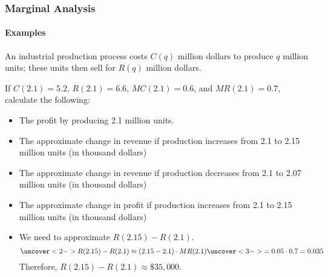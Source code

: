 \documentclass[9pt,xcolor=x11names,compress]{beamer}
\begin{document}
\begin{frame}\frametitle{Marginal Analysis}
\framesubtitle{Examples}
\begin{example}
	An industrial production process costs $C(q)$ million dollars to produce $q$ million units; these units then sell for $R(q)$ million dollars.

	If $C(2.1)=5.2$, $R(2.1)=6.6$, $MC(2.1)=0.6$, and $MR(2.1)=0.7$, calculate the following:
	\begin{itemize}
		\item The profit by producing 2.1 million units.
		\item \alert{The approximate change in revenue if production increases from 2.1 to 2.15 million units (in thousand dollars)}
		\item The approximate change in revenue if production decreases from 2.1 to 2.07 million units (in thousand dollars)
		\item The approximate change in profit if production increases from 2.1 to 2.15 million units (in thousand dollars)
	\end{itemize}
\end{example}
\begin{itemize}
	\item We need to approximate $R(2.15)-R(2.1)$.
	\begin{equation*}
	     \uncover<2->{R(2.15) - R(2.1) \approx (2.15-2.1)\cdot MR(2.1)}\uncover<3->{=0.05 \cdot 0.7=0.035}
     \end{equation*}
     \pause\pause\pause Therefore, $R(2.15)-R(2.1)\approx \$35,000.$
\end{itemize}
\end{frame}
\end{document}
